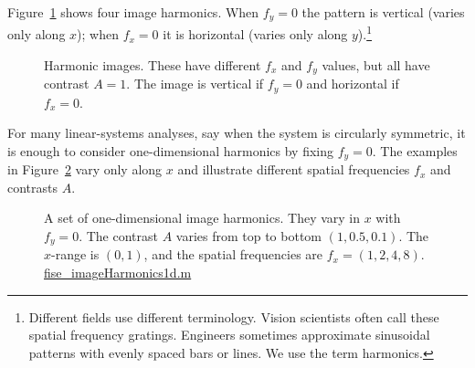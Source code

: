 \documentclass[
  letterpaper,
]{book}
\begin{document}
Figure~\ref{fig-optics-harmonics-2d} shows four image harmonics. When
\(f_y = 0\) the pattern is vertical (varies only along \(x\)); when
\(f_x = 0\) it is horizontal (varies only along \(y\)).\footnote{Different
  fields use different terminology. Vision scientists often call these
  spatial frequency gratings. Engineers sometimes approximate sinusoidal
  patterns with evenly spaced bars or lines. We use the term harmonics.}

\begin{figure}


\caption{\label{fig-optics-harmonics-2d}Harmonic images. These have
different \(f_x\) and \(f_y\) values, but all have contrast \(A=1\). The
image is vertical if \(f_y = 0\) and horizontal if \(f_x = 0\).}

\end{figure}%

For many linear-systems analyses, say when the system is circularly
symmetric, it is enough to consider one-dimensional harmonics by fixing
\(f_y = 0\). The examples in Figure~\ref{fig-optics-harmonics-1d} vary
only along \(x\) and illustrate different spatial frequencies \(f_x\)
and contrasts \(A\).

\begin{figure}


\caption{\label{fig-optics-harmonics-1d}A set of one-dimensional image
harmonics. They vary in \(x\) with \(f_y = 0\). The contrast \(A\)
varies from top to bottom \((1, 0.5, 0.1)\). The \(x\)-range is
\((0,1)\), and the spatial frequencies are \(f_x = (1, 2, 4, 8)\).
\href{../code/02Optics/fise_imageHarmonics1d.html}{fise\_imageHarmonics1d.m}}

\end{figure}%
\end{document}
